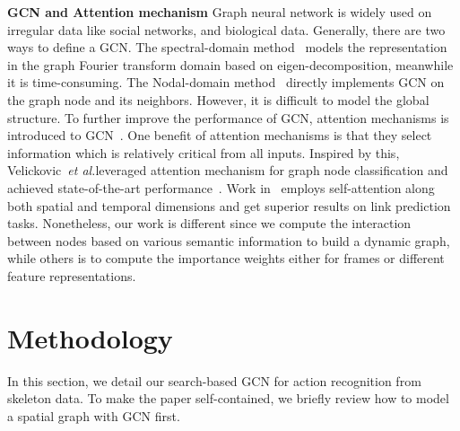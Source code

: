 \documentclass[letterpaper]{article} \usepackage{aaai19}  \usepackage{times}  \usepackage{helvet} \usepackage{courier}  \usepackage[hyphens]{url}  \usepackage{graphicx} \urlstyle{rm} \def\UrlFont{\rm}  \usepackage{graphicx}  \frenchspacing  \setlength{\pdfpagewidth}{8.5in}  \setlength{\pdfpageheight}{11in}
\def\etal{\emph{et al.}}
\begin{document}
\noindent\textbf{GCN and Attention mechanism}  Graph neural network is widely used on irregular data like social networks, and biological data. Generally, there are two ways to define a GCN. The spectral-domain method~\cite{defferrard2016convolutional,kipf2016semi} models the representation in the graph Fourier transform domain based on eigen-decomposition, meanwhile it is time-consuming. The Nodal-domain method~\cite{monti2017geometric,velivckovic2018graph} directly implements GCN on the graph node and its neighbors. However, it is difficult to model the global structure. To further improve the performance of GCN, attention mechanisms is introduced to GCN~\cite{velivckovic2018graph,vaswani2017attention}. One benefit of attention mechanisms is that they select information which is relatively critical from all inputs. Inspired by this, Velickovic~\etal leveraged attention mechanism for graph node classification and achieved state-of-the-art performance~\cite{velivckovic2018graph}. Work in~\cite{sankar2018dynamic} employs self-attention along both spatial and temporal dimensions and get superior results on link prediction tasks. Nonetheless, our work is different since we compute the interaction between nodes based on various semantic information to build a dynamic graph, while others is to compute the importance weights either for frames or different feature representations.




\section{Methodology}
In this section, we detail our search-based GCN for action recognition from skeleton data. To make the paper self-contained, we briefly review how to model a spatial graph with GCN first.
\end{document}
